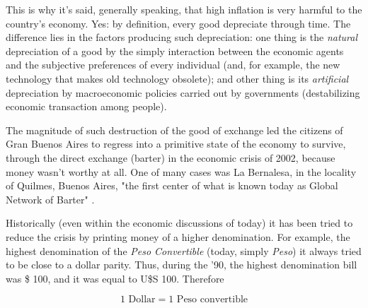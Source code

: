 \documentclass[12pt,a4paper,twoside]{book}
\begin{document}
This is why it's said, generally speaking, that high inflation is very harmful to the country's economy. Yes: by definition, every good depreciate through time. The difference lies in the factors producing such depreciation: one thing is the \textit{natural} depreciation of a good by the simply interaction between the economic agents and the subjective preferences of every individual (and, for example, the new technology that makes old technology obsolete); and other thing is its \textit{artificial} depreciation by macroeconomic policies carried out by governments (destabilizing economic transaction among people).

The magnitude of such destruction of the good of exchange led the citizens of Gran Buenos Aires to regress into a primitive state of the economy to survive, through the direct exchange (barter) in the economic crisis of 2002, because money wasn't worthy at all. One of many cases was La Bernalesa, in the locality of Quilmes, Buenos Aires, "the first center of what is known today as Global Network of Barter" \cite{arg:trueque}.

Historically (even within the economic discussions of today) it has been tried to reduce the crisis by printing money of a higher denomination. For example, the highest denomination of the \textit{Peso Convertible} (today, simply \textit{Peso}) it always tried to be close to a dollar parity. Thus, during the '90, the highest denomination bill was \$ 100, and it was equal to U\$S 100. Therefore

\[
1 \text{ Dollar} = 1 \text{ Peso convertible}
\]
\end{document}
